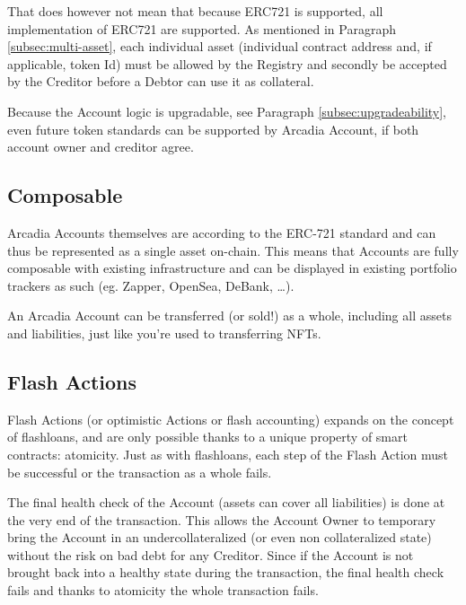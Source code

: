 \documentclass[sigconf,nonacm]{acmart}
\begin{document}
That does however not mean that because ERC721 is supported, all implementation of ERC721 are supported.
As mentioned in Paragraph \ref{subsec:multi-asset}, each individual asset (individual contract address and, if applicable, token Id)
must be allowed by the Registry and secondly be accepted by the Creditor before a Debtor can use it as collateral.

Because the Account logic is upgradable, see Paragraph \ref{subsec:upgradeability}, even future token standards can be supported by Arcadia Account,
if both account owner and creditor agree.

\subsection{Composable}
Arcadia Accounts themselves are according to the ERC-721 standard and can thus be represented as a single asset on-chain.
This means that Accounts are fully composable with existing infrastructure and can be displayed in existing portfolio trackers as such (eg. Zapper, OpenSea, DeBank, …).

An Arcadia Account can be transferred (or sold!) as a whole, including all assets and liabilities, just like you're used to transferring NFTs.

\subsection{Flash Actions}
Flash Actions (or optimistic Actions or flash accounting) expands on the concept of flashloans, and are only possible thanks to a unique property of smart contracts: atomicity\cite{xie2022towards}.
Just as with flashloans, each step of the Flash Action must be successful or the transaction as a whole fails.

The final health check of the Account (assets can cover all liabilities) is done at the very end of the transaction.
This allows the Account Owner to temporary bring the Account in an undercollateralized (or even non collateralized state) without the risk on bad debt for any Creditor.
Since if the Account is not brought back into a healthy state during the transaction, the final health check fails and thanks to atomicity the whole transaction fails.
\end{document}
